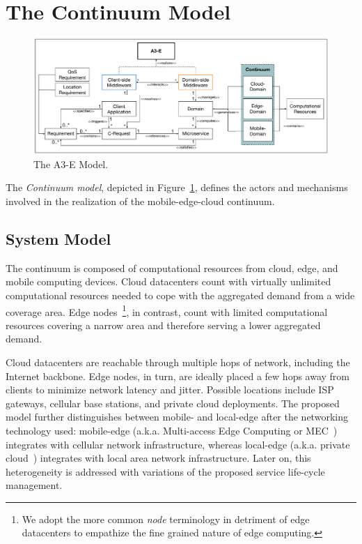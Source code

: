 \section{The Continuum Model}\label{sec:proposal}

\begin{figure}[tbp]
	\includegraphics[width=1\textwidth]{figs/A3-E-model.pdf}
	\caption{The A3-E Model.}
	\label{fig:Continuum-model}
\end{figure}

The \textit{Continuum model}, depicted in Figure~\ref{fig:Continuum-model}, defines the actors and mechanisms involved in the realization of the mobile-edge-cloud continuum. 

\subsection{System Model}

The continuum is composed of computational resources from cloud, edge, and mobile computing devices. Cloud datacenters count with virtually unlimited computational resources needed to cope with the aggregated demand from a wide coverage area. Edge nodes~\footnote{We adopt the more common \textit{node} terminology in detriment of edge datacenters to empathize the fine grained nature of edge computing.}, in contrast, count with limited computational resources covering a narrow area and therefore serving a lower aggregated demand. 

Cloud datacenters are reachable through multiple hops of network, including the Internet backbone. Edge nodes, in turn, are ideally placed a few hops away from clients to minimize network latency and jitter. Possible locations include ISP gateways, cellular base stations, and private cloud deployments. The proposed model further distinguishes between mobile- and local-edge after the networking technology used: mobile-edge (a.k.a. Multi-access Edge Computing or MEC~\cite{}) integrates with cellular network infrastructure, whereas local-edge (a.k.a. private cloud~\cite{}) integrates with local area network infrastructure. Later on, this heterogeneity is addressed with variations of the proposed service life-cycle management.

